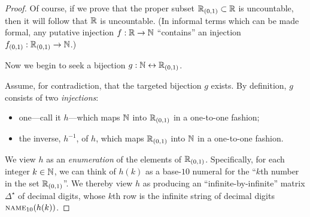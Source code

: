 \begin{proof}
\smallskip

Of course, if we prove that the proper subset $\mathbb{R}_{(0,1)} \subset \mathbb{R}$ is uncountable, then it will follow that $\mathbb{R}$ is uncountable.  (In informal terms which can be made formal, any putative injection $f: \mathbb{R} \rightarrow \mathbb{N}$ ``contains'' an injection $f_{(0,1)}: \mathbb{R}_{(0,1)} \rightarrow \mathbb{N}$.)

\bigskip

Now we begin to seek a bijection $g: \mathbb{N} \leftrightarrow \mathbb{R}_{(0,1)}$.

\smallskip

\noindent
Assume, for contradiction, that the targeted bijection $g$ exists.  By definition, $g$ consists of two {\em injections}:
\begin{itemize}
\item
one---call it $h$---which maps $\mathbb{N}$ into $\mathbb{R}_{(0,1)}$ in a one-to-one fashion;
\item
the inverse, $h^{-1}$, of $h$, which maps $\mathbb{R}_{(0,1)}$ into $\mathbb{N}$ in a one-to-one fashion.
\end{itemize}
We view $h$ as an {\em enumeration} of the elements of $\mathbb{R}_{(0,1)}$.  Specifically, for each integer $k \in \mathbb{N}$, we can think of $h(k)$ as a base-$10$ numeral for the ``$k$th number in the set $\mathbb{R}_{(0,1)}$''.  We thereby view $h$ as producing an ``infinite-by-infinite'' matrix $\Delta^\star$ of decimal digits, whose $k$th row is the infinite string of decimal digits $\mbox{\sc name}_{10}(h(k))$.

\bigskip

\noindent {}


\end{proof}
